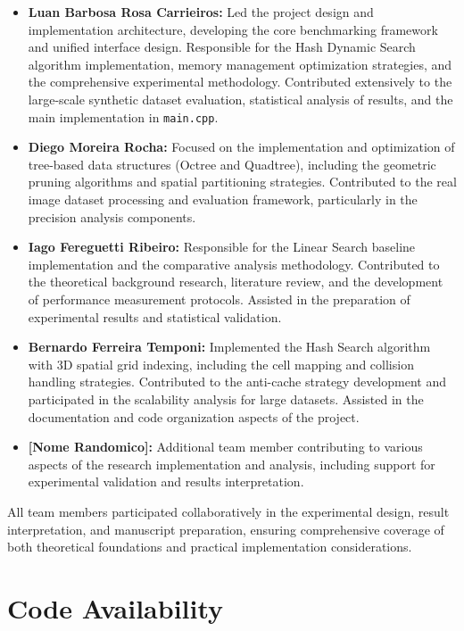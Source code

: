 \documentclass{sbc2023}
\begin{document}
\begin{itemize}
    \item \textbf{Luan Barbosa Rosa Carrieiros:} Led the project design and implementation architecture, developing the core benchmarking framework and unified interface design. Responsible for the Hash Dynamic Search algorithm implementation, memory management optimization strategies, and the comprehensive experimental methodology. Contributed extensively to the large-scale synthetic dataset evaluation, statistical analysis of results, and the main implementation in \texttt{main.cpp}.
    
    \item \textbf{Diego Moreira Rocha:} Focused on the implementation and optimization of tree-based data structures (Octree and Quadtree), including the geometric pruning algorithms and spatial partitioning strategies. Contributed to the real image dataset processing and evaluation framework, particularly in the precision analysis components.
    
    \item \textbf{Iago Fereguetti Ribeiro:} Responsible for the Linear Search baseline implementation and the comparative analysis methodology. Contributed to the theoretical background research, literature review, and the development of performance measurement protocols. Assisted in the preparation of experimental results and statistical validation.
    
    \item \textbf{Bernardo Ferreira Temponi:} Implemented the Hash Search algorithm with 3D spatial grid indexing, including the cell mapping and collision handling strategies. Contributed to the anti-cache strategy development and participated in the scalability analysis for large datasets. Assisted in the documentation and code organization aspects of the project.
    
    \item \textbf{[Nome Randomico]:} Additional team member contributing to various aspects of the research implementation and analysis, including support for experimental validation and results interpretation.
\end{itemize}

All team members participated collaboratively in the experimental design, result interpretation, and manuscript preparation, ensuring comprehensive coverage of both theoretical foundations and practical implementation considerations.

\section*{Code Availability}
\label{sec:code_availability}
\end{document}
